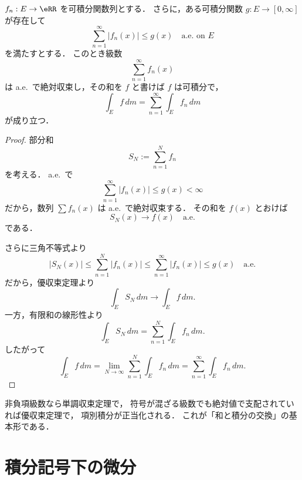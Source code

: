 \begin{theorem}[優収束定理による項別積分]
$f_n:E \to \eRR$ を可積分関数列とする．
さらに，ある可積分関数 $g:E \to [0,\infty]$ が存在して
\[
\sum_{n=1}^{\infty}|f_n(x)|\le g(x) \quad \text{a.e.\ on } E
\]
を満たすとする．
このとき級数
\[
\sum_{n=1}^{\infty}f_n(x)
\]
は a.e.\ で絶対収束し，その和を $f$ と書けば $f$ は可積分で，
\[
\int_E f\,dm
=
\sum_{n=1}^{\infty}\int_E f_n\,dm
\]
が成り立つ．
\end{theorem}
\begin{proof}
部分和
\[
S_N:=\sum_{n=1}^N f_n
\]
を考える．
a.e.\ で
\[
\sum_{n=1}^{\infty}|f_n(x)|\le g(x)<\infty
\]
だから，数列 $\sum f_n(x)$ は a.e.\ で絶対収束する．
その和を $f(x)$ とおけば
\[
S_N(x)\to f(x) \quad \text{a.e.}
\]
である．

さらに三角不等式より
\[
|S_N(x)|
\le
\sum_{n=1}^N |f_n(x)|
\le
\sum_{n=1}^{\infty}|f_n(x)|
\le
g(x)
\quad \text{a.e.}
\]
だから，優収束定理より
\[
\int_E S_N\,dm\to \int_E f\,dm.
\]
一方，有限和の線形性より
\[
\int_E S_N\,dm
=
\sum_{n=1}^N \int_E f_n\,dm.
\]
したがって
\[
\int_E f\,dm
=
\lim_{N\to\infty}\sum_{n=1}^N \int_E f_n\,dm
=
\sum_{n=1}^{\infty}\int_E f_n\,dm.
\]
\end{proof}

\begin{remark}
非負項級数なら単調収束定理で，
符号が混ざる級数でも絶対値で支配されていれば優収束定理で，
項別積分が正当化される．
これが「和と積分の交換」の基本形である．
\end{remark}

\section{積分記号下の微分}

